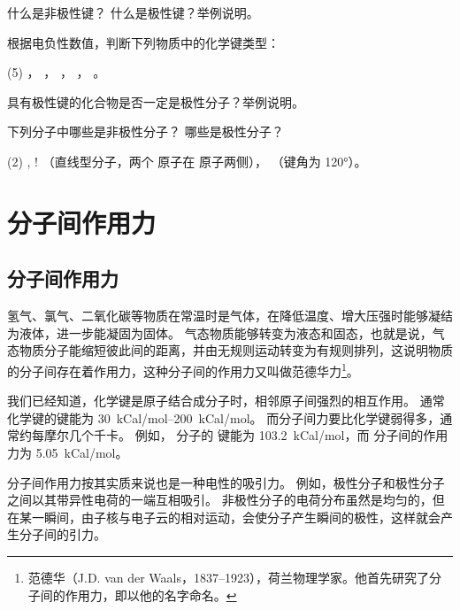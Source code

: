 \begin{Practice}[习题]
\begin{question}
  \item 什么是非极性键？ 什么是极性键？举例说明。
  \item 根据电负性数值，判断下列物质中的化学键类型：
  \begin{tasks}(5)
    \task {}，
    \task {}，
    \task {}，
    \task {}，
    \task {}。
  \end{tasks}
  \item 具有极性键的化合物是否一定是极性分子？举例说明。
  \item 下列分子中哪些是非极性分子？ 哪些是极性分子？
  \begin{tasks}(2)
    \task  {},
    \task  {}
    \task! （直线型分子，两个  原子在  原子两侧），
    \task  {}（键角为 \ang{120}）。
  \end{tasks}
\end{question}
\end{Practice}


\section{分子间作用力}\label{subsec:intermolecular}
\subsection{分子间作用力}
氢气、氯气、二氧化碳等物质在常温时是气体，在降低温度、增大压强时能够凝结为液体，进一步能凝固为固体。
气态物质能够转变为液态和固态，也就是说，气态物质分子能缩短彼此间的距离，并由无规则运动转变为有规则排列，这说明物质的分子间存在着作用力，这种分子间的作用力又叫做范德华力\footnote{范德华（J.D. van der Waals，1837--1923），荷兰物理学家。他首先研究了分子间的作用力，即以他的名字命名。}。

我们已经知道，化学键是原子结合成分子时，相邻原子间强烈的相互作用。
通常化学键的键能为 \qtyrange{30}{200}{kCal/mol}。
而分子间力要比化学键弱得多，通常约每摩尔几个千卡。
例如， 分子的  键能为 \qty{103.2}{kCal/mol}，而  分子间的作用力为 \qty{5.05}{kCal/mol}。

\begin{Reading}[补充阅读]{}
分子间作用力按其实质来说也是一种电性的吸引力。
例如，极性分子和极性分子之间以其带异性电荷的一端互相吸引。
非极性分子的电荷分布虽然是均匀的，但在某一瞬间，由子核与电子云的相对运动，会使分子产生瞬间的极性，这样就会产生分子间的引力。
\end{Reading}

